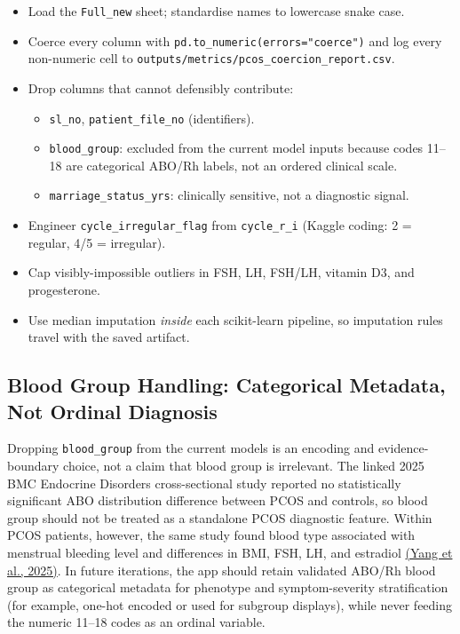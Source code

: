 \documentclass[11pt]{article}
\newcommand{\code}[1]{\texttt{\small #1}}
\begin{document}
\begin{itemize}
  \item Load the \code{Full\_new} sheet; standardise names to lowercase snake case.
  \item Coerce every column with \code{pd.to\_numeric(errors="coerce")} and log every non-numeric cell to \code{outputs/metrics/pcos\_coercion\_report.csv}.
  \item Drop columns that cannot defensibly contribute:
  \begin{itemize}
    \item \code{sl\_no}, \code{patient\_file\_no} (identifiers).
    \item \code{blood\_group}: excluded from the current model inputs because codes 11--18 are categorical ABO/Rh labels, not an ordered clinical scale.
    \item \code{marriage\_status\_yrs}: clinically sensitive, not a diagnostic signal.
  \end{itemize}
  \item Engineer \code{cycle\_irregular\_flag} from \code{cycle\_r\_i} (Kaggle coding: 2 = regular, 4/5 = irregular).
  \item Cap visibly-impossible outliers in FSH, LH, FSH/LH, vitamin D3, and progesterone.
  \item Use median imputation \emph{inside} each scikit-learn pipeline, so imputation rules travel with the saved artifact.
\end{itemize}

\subsection{Blood Group Handling: Categorical Metadata, Not Ordinal Diagnosis}

Dropping \code{blood\_group} from the current models is an encoding and evidence-boundary choice, not a claim that blood group is irrelevant. The linked 2025 BMC Endocrine Disorders cross-sectional study reported no statistically significant ABO distribution difference between PCOS and controls, so blood group should not be treated as a standalone PCOS diagnostic feature. Within PCOS patients, however, the same study found blood type associated with menstrual bleeding level and differences in BMI, FSH, LH, and estradiol \href{https://link.springer.com/article/10.1186/s12902-025-01898-0}{(Yang et al., 2025)}. In future iterations, the app should retain validated ABO/Rh blood group as categorical metadata for phenotype and symptom-severity stratification (for example, one-hot encoded or used for subgroup displays), while never feeding the numeric 11--18 codes as an ordinal variable.
\end{document}
